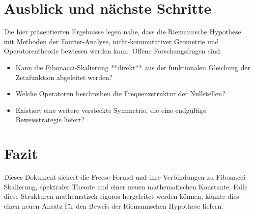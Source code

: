 \documentclass{article}
\begin{document}
\section{Ausblick und nächste Schritte}
Die hier präsentierten Ergebnisse legen nahe, dass die Riemannsche Hypothese mit Methoden der Fourier-Analyse, nicht-kommutativer Geometrie und Operatorentheorie 
bewiesen werden kann. Offene Forschungsfragen sind:
\begin{itemize}
    \item Kann die Fibonacci-Skalierung **direkt** aus der funktionalen Gleichung der Zetafunktion abgeleitet werden?
    \item Welche Operatoren beschreiben die Frequenzstruktur der Nullstellen?
    \item Existiert eine weitere versteckte Symmetrie, die eine endgültige Beweisstrategie liefert?
\end{itemize}

\section{Fazit}
Dieses Dokument sichert die Freese-Formel und ihre Verbindungen zu Fibonacci-Skalierung, spektraler Theorie und einer neuen mathematischen Konstante.
Falls diese Strukturen mathematisch rigoros hergeleitet werden können, könnte dies einen neuen Ansatz für den Beweis der Riemannschen Hypothese liefern.
\end{document}
